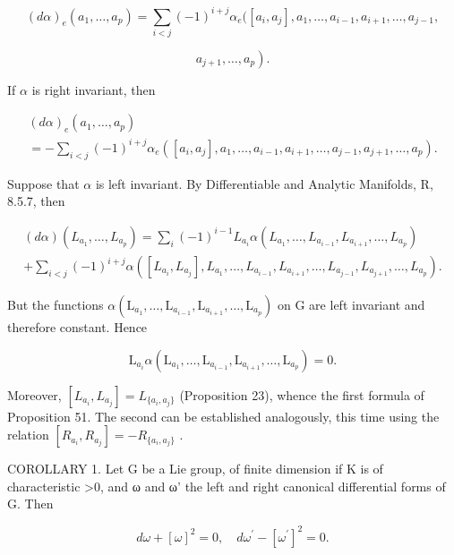 \[
(d \alpha) _ {e} (a _ {1}, \dots , a _ {p}) = \sum_ {i <   j} (- 1) ^ {i + j} \alpha_ {e} ([ a _ {i}, a _ {j} ], a _ {1}, \dots , a _ {i - 1}, a _ {i + 1}, \dots , a _ {j - 1},
\]

\[
\left. a _ {j + 1}, \dots , a _ {p}\right).
\]

If \(\alpha\) is right invariant, then

\[
\begin{array}{l} (d \alpha) _ {e} (a _ {1}, \dots , a _ {p}) \\ = - \sum_ {i <   j} (- 1) ^ {i + j} \alpha_ {e} ([ a _ {i}, a _ {j} ], a _ {1}, \dots , a _ {i - 1}, a _ {i + 1}, \dots , a _ {j - 1}, a _ {j + 1}, \dots , a _ {p}). \end{array}
\]

Suppose that \(\alpha\) is left invariant. By Differentiable and Analytic Manifolds, R, 8.5.7, then

\[
\begin{array}{l} (d \alpha) (L _ {a _ {1}}, \ldots , L _ {a _ {p}}) = \sum_ {i} (- 1) ^ {i - 1} L _ {a _ {i}} \alpha (L _ {a _ {1}}, \ldots , L _ {a _ {i - 1}}, L _ {a _ {i + 1}}, \ldots , L _ {a _ {p}}) \\ + \sum_ {i <   j} (- 1) ^ {i + j} \alpha ([ L _ {a _ {i}}, L _ {a _ {j}} ], L _ {a _ {1}}, \ldots , L _ {a _ {i - 1}}, L _ {a _ {i + 1}}, \ldots , L _ {a _ {j - 1}}, L _ {a _ {j + 1}}, \ldots , L _ {a _ {p}}). \end{array}
\]

But the functions \(\alpha (\mathrm{L}_{a_1},\dots ,\mathrm{L}_{a_{i - 1}},\mathrm{L}_{a_{i + 1}},\dots ,\mathrm{L}_{a_p})\) on G are left invariant and therefore constant. Hence

\[
\mathrm{L} _ {a _ {i}} \alpha (\mathrm{L} _ {a _ {1}}, \dots , \mathrm{L} _ {a _ {i - 1}}, \mathrm{L} _ {a _ {i + 1}}, \dots , \mathrm{L} _ {a _ {p}}) = 0.
\]

Moreover, \([L_{a_{i}}, L_{a_{j}}] = L_{\{a_{i}, a_{j}\}}\) (Proposition 23), whence the first formula of Proposition 51. The second can be established analogously, this time using the relation \([R_{a_{i}}, R_{a_{j}}] = -R_{\{a_{i}, a_{j}\}}\) .

COROLLARY 1. Let G be a Lie group, of finite dimension if K is of characteristic \textgreater0, and ω and ω' the left and right canonical differential forms of G. Then

\[
d \omega + [ \omega ] ^ {2} = 0, \quad d \omega^ {\prime} - [ \omega^ {\prime} ] ^ {2} = 0.
\]

